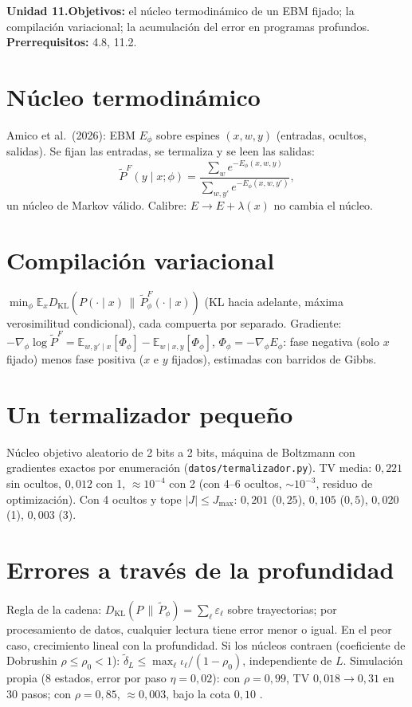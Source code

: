 \documentclass[11pt,a4paper]{article}
\begin{document}

\noindent\textbf{Unidad 11.}\quad\textbf{Objetivos:} el núcleo termodinámico de un EBM fijado; la compilación variacional; la acumulación del error en programas
profundos.
\textbf{Prerrequisitos:} 4.8, 11.2.

\section{Núcleo termodinámico}
Amico et al.\ (2026): EBM $E_\phi$ sobre espines $(x,w,y)$ (entradas, ocultos, salidas). Se fijan las entradas, se termaliza y se leen las salidas:
\[\tilde P^F(y\mid x;\phi)=\frac{\sum_we^{-E_\phi(x,w,y)}}{\sum_{w,y'}e^{-E_\phi(x,w,y')}},\]
un núcleo de Markov válido. Calibre: $E\to E+\lambda(x)$ no cambia el núcleo.

\section{Compilación variacional}
$\min_\phi\mathbb E_x D_{\mathrm{KL}}(P(\cdot\mid x)\,\|\,\tilde P^F_\phi(\cdot\mid x))$ (KL hacia adelante, máxima verosimilitud condicional), cada compuerta por separado.
Gradiente: $-\nabla_\phi\log\tilde P^F=\mathbb E_{w,y'\mid x}[\Phi_\phi]-\mathbb E_{w\mid x,y}[\Phi_\phi]$, $\Phi_\phi=-\nabla_\phi E_\phi$: fase negativa (solo $x$ fijado) menos
fase positiva ($x$ e $y$ fijados), estimadas con barridos de Gibbs.

\section{Un termalizador pequeño \evS}
Núcleo objetivo aleatorio de 2 bits a 2 bits, máquina de Boltzmann con gradientes exactos por enumeración (\texttt{datos/termalizador.py}). TV media: $0{,}221$ sin ocultos,
$0{,}012$ con 1, $\approx10^{-4}$ con 2 (con 4--6 ocultos, $\sim10^{-3}$, residuo de optimización). Con 4 ocultos y tope $|J|\le J_{\max}$: $0{,}201$ ($0{,}25$),
$0{,}105$ ($0{,}5$), $0{,}020$ (1), $0{,}003$ (3).

\section{Errores a través de la profundidad}
Regla de la cadena: $D_{\mathrm{KL}}(P\,\|\,\tilde P_\phi)=\sum_\ell\varepsilon_\ell$ sobre trayectorias; por procesamiento de datos, cualquier lectura tiene error menor o igual. En el peor caso,
crecimiento lineal con la profundidad. Si los núcleos contraen (coeficiente de Dobrushin $\rho\le\rho_0<1$): $\tilde\delta_L\le\max_\ell\iota_\ell/(1-\rho_0)$, independiente
de $L$. Simulación propia (8 estados, error por paso $\eta=0{,}02$): con $\rho=0{,}99$, TV $0{,}018\to0{,}31$ en 30 pasos; con $\rho=0{,}85$, $\approx0{,}003$, bajo la cota
$0{,}10$ \evS.
\end{document}
